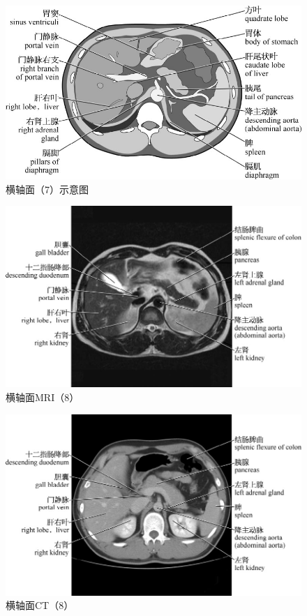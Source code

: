 \begin{figure}[!htbp]
 \centering
 \includegraphics{./images/Image00022.jpg}
 \captionsetup{justification=centering}
 \caption{横轴面（7）示意图}
  \end{figure} 
 \FloatBarrier

\begin{figure}[!htbp]
 \centering
 \includegraphics{./images/Image00023.jpg}
 \captionsetup{justification=centering}
 \caption{横轴面MRI（8）}
  \end{figure} 
 \FloatBarrier

\begin{figure}[!htbp]
 \centering
 \includegraphics{./images/Image00024.jpg}
 \captionsetup{justification=centering}
 \caption{横轴面CT（8）}
  \end{figure} 
 \FloatBarrier

